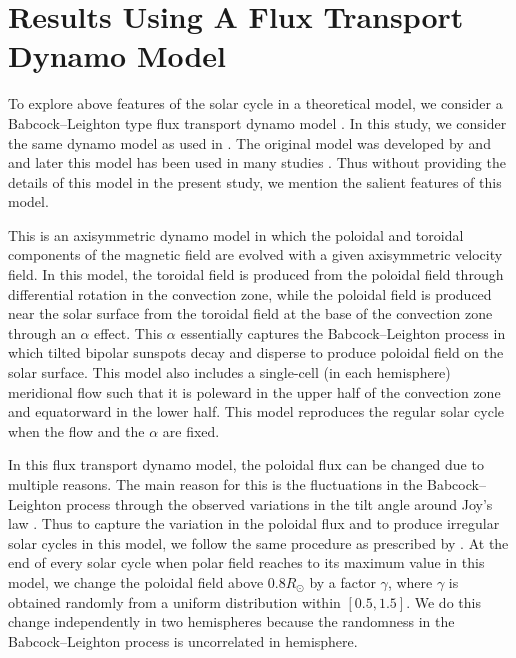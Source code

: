 \documentclass[preprint2,times,tighten]{aastex61}
\begin{document}
\section{Results Using A Flux Transport Dynamo Model }\label{sec:dynamo}

To explore above features of the solar cycle in a theoretical model, we
consider a Babcock--Leighton type flux transport dynamo model \citep{CSD95,DC99}. 
In this study, we consider the same dynamo model as used in \citet{KC11}. The original model was developed by \citet{NC02} and \citet{CNC04} and
later this model has been used in many studies \citep[see a review by][]{Ch15}. 
Thus without providing the details of this model in the present study, 
we mention the salient features of this model.

This is an axisymmetric dynamo model in which the poloidal and toroidal components of the magnetic field are evolved with a given axisymmetric velocity field. In this model, the toroidal field is produced from the poloidal field through differential rotation in the convection zone, while the poloidal field is produced near the solar surface from the toroidal field at the base of the convection zone through an $\alpha$ effect. 
This $\alpha$ essentially captures the Babcock--Leighton process in which tilted bipolar sunspots decay and disperse to produce poloidal field on the solar surface. 
This model also includes a single-cell (in each hemisphere) meridional flow such that it is poleward in the upper half of the convection zone and equatorward in the lower half. This model reproduces the regular solar cycle when the flow and the $\alpha$ are fixed.

In this flux transport dynamo model, the poloidal flux can be changed due to multiple reasons. The main reason for this is the fluctuations in the Babcock--Leighton process through the observed variations in the tilt angle around Joy's law  \citep{Das10, SK12, JCS14, KM17}. Thus to capture the variation in the poloidal flux and to produce irregular solar cycles in this model, we follow the same procedure as prescribed by \cite{CCJ07}. At the end of every solar cycle when polar field reaches to its maximum value in this model, we change the poloidal field above $0.8R_\odot$ by a factor $\gamma$, where $\gamma$ is obtained randomly from a uniform distribution within $[0.5, 1.5]$. We do this change independently in two hemispheres because the randomness in the Babcock--Leighton process is uncorrelated in hemisphere.
\end{document}
